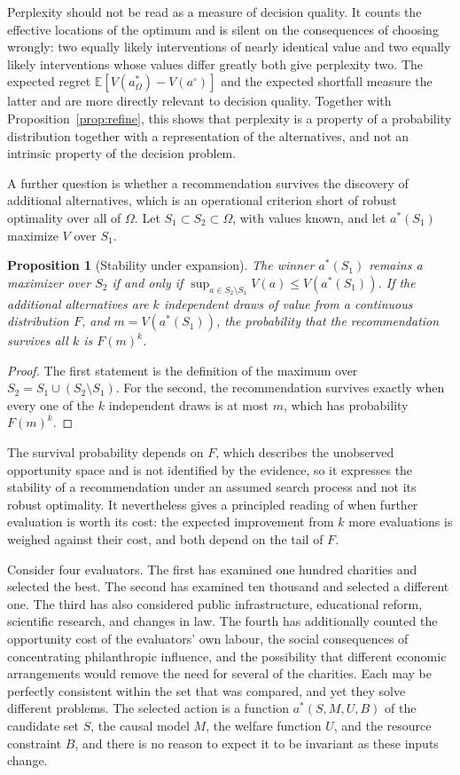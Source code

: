 \documentclass[11pt]{article}
\newtheorem{proposition}{Proposition}
\theoremstyle{definition}
\theoremstyle{remark}
\newcommand{\E}{\mathbb{E}}
\begin{document}
Perplexity should not be read as a measure of decision quality. It counts the effective locations of the optimum and is silent on the consequences of choosing wrongly: two equally likely interventions of nearly identical value and two equally likely interventions whose values differ greatly both give perplexity two. The expected regret $\E[V(a_\Omega^{*})-V(a^{\circ})]$ and the expected shortfall measure the latter and are more directly relevant to decision quality. Together with Proposition~\ref{prop:refine}, this shows that perplexity is a property of a probability distribution together with a representation of the alternatives, and not an intrinsic property of the decision problem.

A further question is whether a recommendation survives the discovery of additional alternatives, which is an operational criterion short of robust optimality over all of $\Omega$. Let $S_1\subset S_2\subset\Omega$, with values known, and let $a^{*}(S_1)$ maximize $V$ over $S_1$.

\begin{proposition}[Stability under expansion]
\label{prop:stability}
The winner $a^{*}(S_1)$ remains a maximizer over $S_2$ if and only if $\sup_{a\in S_2\setminus S_1}V(a)\le V(a^{*}(S_1))$. If the additional alternatives are $k$ independent draws of value from a continuous distribution $F$, and $m=V(a^{*}(S_1))$, the probability that the recommendation survives all $k$ is $F(m)^{k}$.
\end{proposition}

\begin{proof}
The first statement is the definition of the maximum over $S_2=S_1\cup(S_2\setminus S_1)$. For the second, the recommendation survives exactly when every one of the $k$ independent draws is at most $m$, which has probability $F(m)^{k}$.
\end{proof}

The survival probability depends on $F$, which describes the unobserved opportunity space and is not identified by the evidence, so it expresses the stability of a recommendation under an assumed search process and not its robust optimality. It nevertheless gives a principled reading of when further evaluation is worth its cost: the expected improvement from $k$ more evaluations is weighed against their cost, and both depend on the tail of $F$.

Consider four evaluators. The first has examined one hundred charities and selected the best. The second has examined ten thousand and selected a different one. The third has also considered public infrastructure, educational reform, scientific research, and changes in law. The fourth has additionally counted the opportunity cost of the evaluators' own labour, the social consequences of concentrating philanthropic influence, and the possibility that different economic arrangements would remove the need for several of the charities. Each may be perfectly consistent within the set that was compared, and yet they solve different problems. The selected action is a function $a^{*}(S,M,U,B)$ of the candidate set $S$, the causal model $M$, the welfare function $U$, and the resource constraint $B$, and there is no reason to expect it to be invariant as these inputs change.
\end{document}
